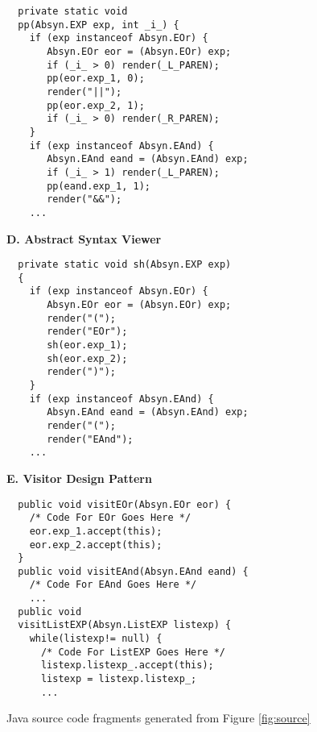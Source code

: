 \begin{figure}
\begin{boxedminipage}[t]{\textwidth}
\begin{minipage}[r]{0.5\textwidth}
\scriptsize
\begin{verbatim}
  private static void 
  pp(Absyn.EXP exp, int _i_) {
    if (exp instanceof Absyn.EOr) {
       Absyn.EOr eor = (Absyn.EOr) exp;
       if (_i_ > 0) render(_L_PAREN);
       pp(eor.exp_1, 0);
       render("||");
       pp(eor.exp_2, 1);
       if (_i_ > 0) render(_R_PAREN);
    }
    if (exp instanceof Absyn.EAnd) {
       Absyn.EAnd eand = (Absyn.EAnd) exp;
       if (_i_ > 1) render(_L_PAREN);
       pp(eand.exp_1, 1);
       render("&&");
    ...
\end{verbatim}
\normalsize
\textbf{D. Abstract Syntax Viewer}
\scriptsize
\begin{verbatim}
  private static void sh(Absyn.EXP exp)
  {
    if (exp instanceof Absyn.EOr) {
       Absyn.EOr eor = (Absyn.EOr) exp;
       render("(");
       render("EOr");
       sh(eor.exp_1);
       sh(eor.exp_2);
       render(")");
    }
    if (exp instanceof Absyn.EAnd) {
       Absyn.EAnd eand = (Absyn.EAnd) exp;
       render("(");
       render("EAnd");
    ...
\end{verbatim}
\normalsize

\textbf{E. Visitor Design Pattern}

\scriptsize
\begin{verbatim}
  public void visitEOr(Absyn.EOr eor) {
    /* Code For EOr Goes Here */
    eor.exp_1.accept(this);
    eor.exp_2.accept(this);
  }
  public void visitEAnd(Absyn.EAnd eand) {
    /* Code For EAnd Goes Here */
    ...
  public void 
  visitListEXP(Absyn.ListEXP listexp) {
    while(listexp!= null) {
      /* Code For ListEXP Goes Here */
      listexp.listexp_.accept(this);
      listexp = listexp.listexp_;
      ...
\end{verbatim}
\normalsize

\hfill
\end{minipage}
\end{boxedminipage}
\caption{Java source code fragments generated from Figure \ref{fig:source}}
\label{fig:java}
\end{figure}

